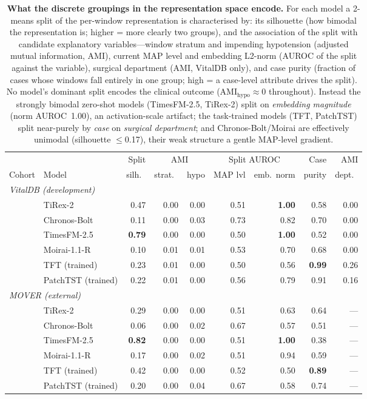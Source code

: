 \begin{table}[ht]
\centering\footnotesize
\caption{\textbf{What the discrete groupings in the representation space encode.} For each model a 2-means split of the per-window representation is characterised by: its silhouette (how bimodal the representation is; higher = more clearly two groups), and the association of the split with candidate explanatory variables---window stratum and impending hypotension (adjusted mutual information, AMI), current MAP level and embedding L2-norm (AUROC of the split against the variable), surgical department (AMI, VitalDB only), and case purity (fraction of cases whose windows fall entirely in one group; high = a case-level attribute drives the split). No model's dominant split encodes the clinical outcome (AMI$_{\text{hypo}}\!\approx\!0$ throughout). Instead the strongly bimodal zero-shot models (TimesFM-2.5, TiRex-2) split on \emph{embedding magnitude} (norm AUROC~1.00), an activation-scale artifact; the task-trained models (TFT, PatchTST) split near-purely by \emph{case} on \emph{surgical department}; and Chronos-Bolt/Moirai are effectively unimodal (silhouette $\leq$0.17), their weak structure a gentle MAP-level gradient.}
\label{tab:cluster_char}
\begin{tabular}{llrrrrrrr}
\toprule
& & Split & \multicolumn{2}{c}{AMI} & \multicolumn{2}{c}{Split AUROC} & Case & AMI \\
\cmidrule(lr){4-5}\cmidrule(lr){6-7}
Cohort & Model & silh.\ & strat.\ & hypo & MAP lvl & emb.\ norm & purity & dept.\ \\
\midrule
\multicolumn{9}{l}{\textit{VitalDB (development)}}\\
& TiRex-2 & 0.47 & 0.00 & 0.00 & 0.51 & \textbf{1.00} & 0.58 & 0.00 \\
& Chronos-Bolt & 0.11 & 0.00 & 0.03 & 0.73 & 0.82 & 0.70 & 0.00 \\
& TimesFM-2.5 & \textbf{0.79} & 0.00 & 0.00 & 0.50 & \textbf{1.00} & 0.52 & 0.00 \\
& Moirai-1.1-R & 0.10 & 0.01 & 0.01 & 0.53 & 0.70 & 0.68 & 0.00 \\
& TFT (trained) & 0.23 & 0.01 & 0.00 & 0.50 & 0.56 & \textbf{0.99} & 0.26 \\
& PatchTST (trained) & 0.22 & 0.01 & 0.00 & 0.56 & 0.79 & 0.91 & 0.16 \\
\midrule
\multicolumn{9}{l}{\textit{MOVER (external)}}\\
& TiRex-2 & 0.29 & 0.00 & 0.00 & 0.51 & 0.63 & 0.64 & --- \\
& Chronos-Bolt & 0.06 & 0.00 & 0.02 & 0.67 & 0.57 & 0.51 & --- \\
& TimesFM-2.5 & \textbf{0.82} & 0.00 & 0.00 & 0.51 & \textbf{1.00} & 0.38 & --- \\
& Moirai-1.1-R & 0.17 & 0.00 & 0.02 & 0.51 & 0.94 & 0.59 & --- \\
& TFT (trained) & 0.42 & 0.00 & 0.00 & 0.52 & 0.50 & \textbf{0.89} & --- \\
& PatchTST (trained) & 0.20 & 0.00 & 0.04 & 0.67 & 0.58 & 0.74 & --- \\
\bottomrule
\end{tabular}
\end{table}


